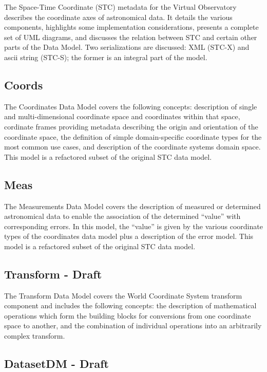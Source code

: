\documentclass[11pt,a4paper]{ivoa}
\begin{document}
The Space-Time Coordinate (STC) metadata for the Virtual Observatory describes the coordinate 
axes of astronomical data. It details the various components, highlights some implementation 
considerations, presents a complete set of UML diagrams, and discusses the relation between 
STC and certain other parts of the Data Model. Two serializations are discussed: XML (STC-X) and
ascii string (STC-S); the former is an integral part of the model.

\subsection{Coords}

The Coordinates Data Model covers the following concepts: description of single and multi-dimensional 
coordinate space and coordinates within that space, cordinate frames providing metadata describing the 
origin and orientation of the coordinate space, the definition of simple domain-specific coordinate
types for the most common use cases, and description of the coordinate systems domain space. This
model is a refactored subset of the original STC data model.

\subsection{Meas}

The Measurements Data Model covers the description of measured or determined astronomical data 
to enable the association of the determined ``value'' with corresponding errors. In this model, 
the ``value'' is given by the various coordinate types of the coordinates data model plus a 
description of the error model.  This model is a refactored subset of the original STC data model.

\subsection{Transform - Draft}

The Transform Data Model covers the World Coordinate System transform component and includes 
the following concepts: the description of mathematical operations which form the building 
blocks for conversions from one coordinate space to another, and the combination of individual 
operations into an arbitrarily complex transform.
 
\subsection{DatasetDM - Draft}
\end{document}
